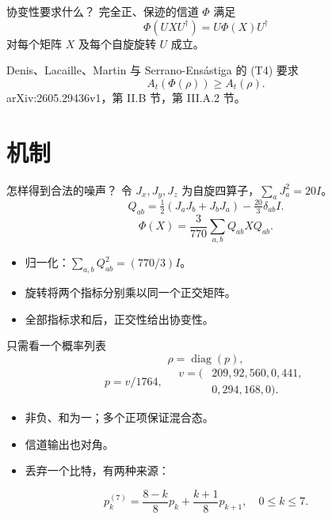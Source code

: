 \documentclass{beamer}
\begin{document}
\begin{frame}{协变性要求什么？}
完全正、保迹的信道 $\Phi$ 满足
\[\Phi(UXU^\dagger)=U\Phi(X)U^\dagger\]
对每个矩阵 $X$ 及每个自旋旋转 $U$ 成立。
\medskip

Denis、Lacaille、Martin 与 Serrano-Ensástiga 的 (T4) 要求
\[A_t(\Phi(\rho))\geq A_t(\rho).\]
\small arXiv:2605.29436v1，第 II.B 节，第 III.A.2 节。
\end{frame}
\section{机制}
\begin{frame}{怎样得到合法的噪声？}
令 $J_x,J_y,J_z$ 为自旋四算子，$\sum_aJ_a^2=20I$。
\[Q_{ab}=\tfrac12(J_aJ_b+J_bJ_a)-\tfrac{20}{3}\delta_{ab}I.\]
\[\Phi(X)=\frac3{770}\sum_{a,b}Q_{ab}XQ_{ab}.\]
\begin{itemize}
\item 归一化：$\sum_{a,b}Q_{ab}^2=(770/3)I$。
\item 旋转将两个指标分别乘以同一个正交矩阵。
\item 全部指标求和后，正交性给出协变性。
\end{itemize}
\end{frame}
\begin{frame}{只需看一个概率列表}
\[\rho=\operatorname{diag}(p),\]
\[p=v/1764,\quad
\begin{aligned}v=(&209,92,560,0,441,\\&0,294,168,0).\end{aligned}\]
\begin{itemize}
\item 非负、和为一；多个正项保证混合态。
\item 信道输出也对角。
\item 丢弃一个比特，有两种来源：
\end{itemize}
\[p_k^{(7)}=\frac{8-k}{8}p_k+\frac{k+1}{8}p_{k+1},\quad 0\leq k\leq7.\]
\end{frame}
\end{document}
